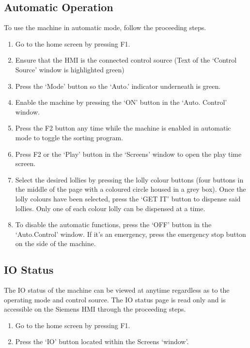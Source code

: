     \subsection{Automatic Operation}
        To use the machine in automatic mode, follow the proceeding steps. 
            \begin{enumerate}
                \item Go to the home screen by pressing F1.
                \item Ensure that the HMI is the connected control source (Text of the `Control Source' window is highlighted green)
                \item Press the `Mode' button so the `Auto.' indicator underneath is green.
                \item Enable the machine by pressing the `ON' button in the `Auto. Control' window.
                \item Press the F2 button any time while the machine is enabled in automatic mode to toggle the sorting program. 
                \item Press F2 or the `Play' button in the `Screens' window to open the play time screen.
                \item Select the desired lollies by pressing the lolly colour buttons (four buttons in the middle of the page with a coloured circle housed in a grey box). Once the lolly colours have been selected, press the `GET IT' button to dispense said lollies. Only one of each colour lolly can be dispensed at a time. 
                \item To disable the automatic functions, press the `OFF' button in the `Auto.Control' window. If it's an emergency, press the emergency stop button on the side of the machine. 
            \end{enumerate}
        \subsection{IO Status}
            The IO status of the machine can be viewed at anytime regardless as to the operating mode and control source. The IO status page is read only and is accessible on the Siemens HMI through the proceeding steps. 

        \begin{enumerate}
            \item Go to the home screen by pressing F1.
            \item Press the `IO' button located within the Screens `window'.
        \end{enumerate}
            
